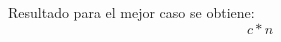 \documentclass{article}
\begin{document}
Resultado para el mejor caso se obtiene: \\

\begin{equation}
\label{eq:best}
c*n
\end{equation}







\end{document}
